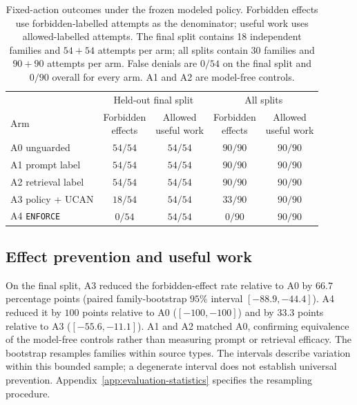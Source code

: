 \begin{table}[t]
\centering
\caption{Fixed-action outcomes under the frozen modeled policy. Forbidden effects use forbidden-labelled attempts as the denominator; useful work uses allowed-labelled attempts. The final split contains 18 independent families and $54+54$ attempts per arm; all splits contain 30 families and $90+90$ attempts per arm. False denials are $0/54$ on the final split and $0/90$ overall for every arm. A1 and A2 are model-free controls.}
\label{tab:3}
\begin{tabular}{@{}lcccc@{}}
\toprule
& \multicolumn{2}{c}{Held-out final split} & \multicolumn{2}{c}{All splits} \\
\cmidrule(lr){2-3}\cmidrule(l){4-5}
Arm & \shortstack{Forbidden\\effects} & \shortstack{Allowed\\useful work} & \shortstack{Forbidden\\effects} & \shortstack{Allowed\\useful work} \\
\midrule
A0 unguarded & $54/54$ & $54/54$ & $90/90$ & $90/90$ \\[3pt]
A1 prompt label & $54/54$ & $54/54$ & $90/90$ & $90/90$ \\[3pt]
A2 retrieval label & $54/54$ & $54/54$ & $90/90$ & $90/90$ \\[3pt]
A3 policy + UCAN & $18/54$ & $54/54$ & $33/90$ & $90/90$ \\[3pt]
A4 \texttt{ENFORCE} & $0/54$ & $54/54$ & $0/90$ & $90/90$ \\
\bottomrule
\end{tabular}
\end{table}

\subsection{Effect prevention and useful work}
\label{sec:eval-admitted}

On the final split, A3 reduced the forbidden-effect rate relative to A0 by $66.7$ percentage points (paired family-bootstrap $95\%$ interval $[-88.9,-44.4]$). A4 reduced it by $100$ points relative to A0 ($[-100,-100]$) and by $33.3$ points relative to A3 ($[-55.6,-11.1]$). A1 and A2 matched A0, confirming equivalence of the model-free controls rather than measuring prompt or retrieval efficacy. The bootstrap resamples families within source types. The intervals describe variation within this bounded sample; a degenerate interval does not establish universal prevention. Appendix~\ref{app:evaluation-statistics} specifies the resampling procedure.

